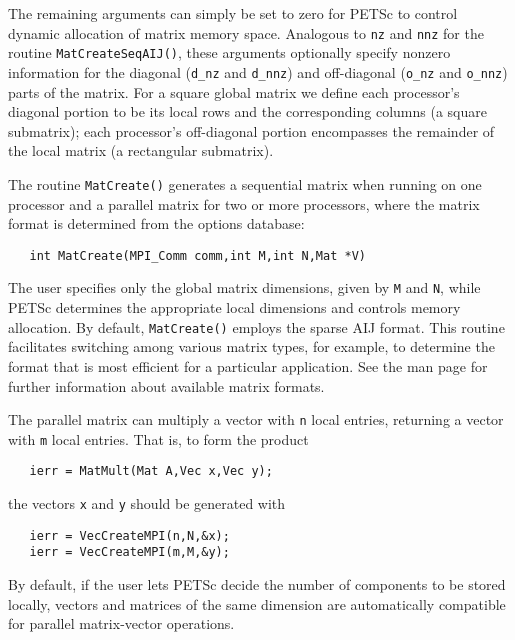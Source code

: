 The remaining arguments can simply be set to zero for PETSc to control
dynamic allocation of matrix memory space.  
Analogous to {\tt nz} and {\tt nnz} for the routine 
{\tt MatCreateSeqAIJ()}, these arguments optionally specify 
nonzero information for the diagonal ({\tt d\_nz} and {\tt d\_nnz}) and 
off-diagonal ({\tt o\_nz} and {\tt o\_nnz}) parts of the matrix. 
For a square global matrix we define each processor's diagonal portion 
to be its local rows and the corresponding columns (a square submatrix);  
each processor's off-diagonal portion encompasses the remainder of the
local matrix (a rectangular submatrix).  

The routine {\tt MatCreate()}  generates a
sequential matrix when running on one processor and a parallel matrix
for two or more processors, where the matrix format is determined from the
options database:
\begin{verbatim}
   int MatCreate(MPI_Comm comm,int M,int N,Mat *V)
\end{verbatim}
The user specifies only the global matrix dimensions, given by {\tt M}
and {\tt N}, while PETSc determines the appropriate local dimensions
and controls memory allocation.  By default, {\tt MatCreate()} employs
the sparse AIJ format.  This routine facilitates switching among
various matrix types, for example, to determine the format that is
most efficient for a particular application.   See
the man page for further information about available matrix formats.

The parallel matrix can multiply a vector with {\tt n} 
local entries, returning a vector with {\tt m} local entries. That is, 
to form the product 
\begin{verbatim}
   ierr = MatMult(Mat A,Vec x,Vec y);
\end{verbatim}
the vectors {\tt x} and {\tt y} should be generated with 
\begin{verbatim}
   ierr = VecCreateMPI(n,N,&x);
   ierr = VecCreateMPI(m,M,&y);
\end{verbatim}
By default, if the user lets PETSc decide the number of components to
be stored locally, vectors and matrices of the same dimension are
automatically compatible for parallel matrix-vector operations.

